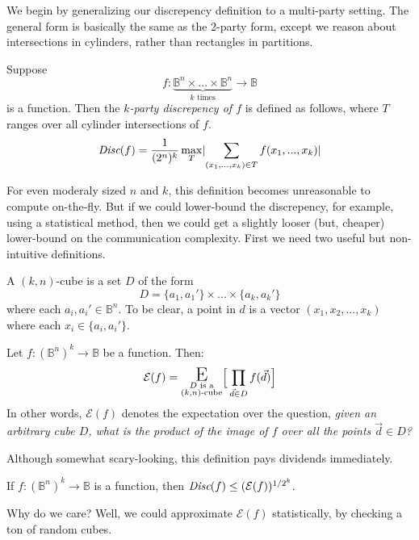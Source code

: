 \documentclass[12pt]{article}
\begin{document}
\maketitle

We begin by generalizing our discrepency definition to a multi-party setting.
The general form is basically the same as the 2-party form, except we reason about intersections in cylinders, rather than rectangles in partitions.
\begin{definition}
Suppose
\[f : \underbrace{\mathbb{B}^n \times ... \times \mathbb{B}^n}_{k \text{ times}} \to \mathbb{B}\]
is a function.  Then the \emph{$k$-party discrepency of $f$} is defined as follows, where $T$ ranges over all cylinder intersections of $f$.
\[\emph{Disc}(f) = \frac{1}{(2^n)^k} \max_T \lvert\sum_{(x_1,...,x_k) \in T} f(x_1,...,x_k)\rvert\]
\end{definition}
For even moderaly sized $n$ and $k$, this definition becomes unreasonable to compute on-the-fly.  But if we could lower-bound the discrepency, for example, using a statistical method, then we could get a slightly looser (but, cheaper) lower-bound on the communication complexity.
First we need two useful but non-intuitive definitions.
\begin{definition}[$(k, n)$-Cube]
A $(k, n)$-cube is a set $D$ of the form
\[D = \{ a_1, a_1' \} \times ... \times \{ a_k, a_k' \}\]
where each $a_i, a_i' \in \mathbb{B}^n$.
To be clear, a point in $d$ is a vector $(x_1, x_2, ..., x_k)$ where each $x_i \in \{ a_i, a_i' \}$.
\end{definition}
\begin{definition}[$\mathcal{E}$]
Let $f : (\mathbb{B}^n)^k \to \mathbb{B}$ be a function.
Then:
\[\mathcal{E}(f) = \underset{\substack{D \text{ is a}\\(k, n)\text{-cube}}}{{\LARGE \text{E}}} \Big[\prod_{\vec{d} \in D} f(\vec{d}) \Big]\]
In other words, $\mathcal{E}(f)$ denotes the expectation over the question,
	\emph{given an arbitrary cube $D$, what is the product of the image of $f$ over all the points $\vec{d} \in D$?}
\end{definition}
Although somewhat scary-looking, this definition pays dividends immediately.
\begin{lemma}
If $f : (\mathbb{B}^n)^k \to \mathbb{B}$ is a function,
then $\emph{Disc}(f) \leq (\mathcal{E}(f))^{1/2^k}$.
\end{lemma}
Why do we care?  Well, we could approximate $\mathcal{E}(f)$ statistically,
	by checking a ton of random cubes.
\end{document}
